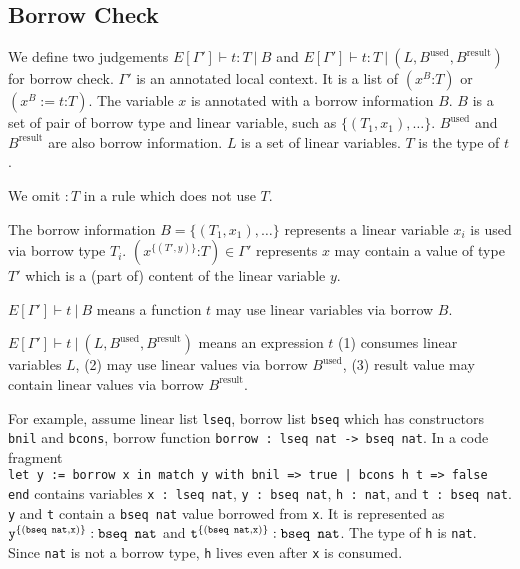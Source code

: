 \documentclass[a4paper,fleqn]{article}
\newcommand{\lassum}[2]{(#1\mathord{:}#2)}
\newcommand{\ldef}[3]{(#1:=#2\mathord{:}#3)}
\begin{document}
\subsection{Borrow Check}\label{sec:borrow-check}

We define two judgements $E[\Gamma'] \vdash t:T~|~B$ and $E[\Gamma'] \vdash t:T~|~(L, B^\text{used}, B^\text{result})$ for borrow check.
$\Gamma'$ is an annotated local context.
It is a list of $\lassum{x^B}{T}$ or $\ldef{x^B}{t}{T}$.
The variable $x$ is annotated with a borrow information $B$.
$B$ is a set of pair of borrow type and linear variable, such as $\{(T_1,x_1),\ldots\}$.
$B^\text{used}$ and $B^\text{result}$ are also borrow information.
$L$ is a set of linear variables.
$T$ is the type of $t$.

We omit $:T$ in a rule which does not use $T$.

The borrow information $B=\{(T_1,x_1),\ldots\}$ represents a linear variable $x_i$ is used via borrow type $T_i$.
$\lassum{x^{\{(T',y)\}}}{T}\in \Gamma'$ represents $x$ may contain a value of type $T'$ which is a (part of) content of the linear variable $y$.

$E[\Gamma'] \vdash t~|~B$ means a function $t$ may use linear variables via borrow $B$.

$E[\Gamma'] \vdash t~|~(L, B^\text{used}, B^\text{result})$ means an expression $t$
(1) consumes linear variables $L$,
(2) may use linear values via borrow $B^\text{used}$,
(3) result value may contain linear values via borrow $B^\text{result}$.

For example, assume linear list \lstinline!lseq!, borrow list \lstinline!bseq! which has constructors \lstinline!bnil! and \lstinline!bcons!,
borrow function \lstinline!borrow : lseq nat -> bseq nat!.
In a code fragment \\
\lstinline!let y := borrow x in match y with bnil => true | bcons h t => false end! contains variables
\lstinline!x : lseq nat!,
\lstinline!y : bseq nat!,
\lstinline!h : nat!, and
\lstinline!t : bseq nat!.
\texttt{y} and \texttt{t} contain a \texttt{bseq nat} value borrowed from \texttt{x}.
It is represented as
$\texttt{y}^{\{(\texttt{bseq nat},\texttt{x})\}}:\text{\texttt{bseq nat}}$ and
$\texttt{t}^{\{(\texttt{bseq nat},\texttt{x})\}}:\text{\texttt{bseq nat}}$.
The type of \texttt{h} is \texttt{nat}.
Since \texttt{nat} is not a borrow type, \texttt{h} lives even after \texttt{x} is consumed.
\end{document}
